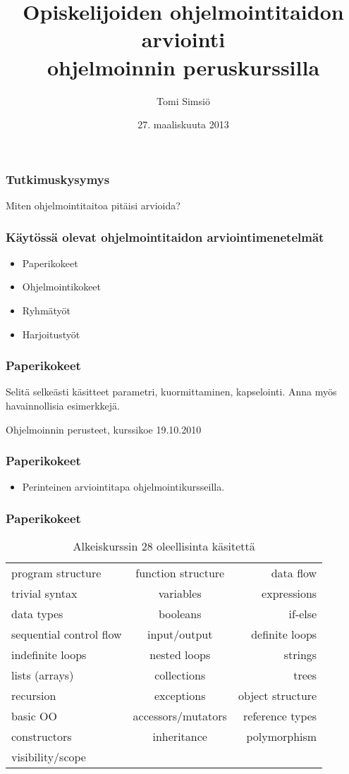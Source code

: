 \documentclass[finnish]{beamer}
\author{Tomi Simsiö}
\title{Opiskelijoiden ohjelmointitaidon arviointi \texorpdfstring{\\}{}ohjelmoinnin peruskurssilla}
\institute{HELSINGIN YLIOPISTO\\Tietojenkäsittelytieteen laitos}
\date{27. maaliskuuta 2013}
\begin{document}
\frame{\titlepage}

\frame
{
  \frametitle{Tutkimuskysymys}
  {\LARGE Miten ohjelmointitaitoa pitäisi arvioida?}
}

\frame
{
  \frametitle{Käytössä olevat ohjelmointitaidon arviointimenetelmät}
  \begin{itemize}
    \item Paperikokeet
    \item Ohjelmointikokeet
    \item Ryhmätyöt
    \item Harjoitustyöt
  \end{itemize}
}

\frame
{
  \frametitle{Paperikokeet}
  Selitä selkeästi käsitteet parametri, kuormittaminen, kapselointi. Anna myös havainnollisia esimerkkejä.
  \vspace{5mm}

  \textcolor[rgb]{0.5,0.5,0.5}{\scriptsize Ohjelmoinnin perusteet, kurssikoe 19.10.2010}
}

\frame
{
  \frametitle{Paperikokeet}
  \begin{itemize}
    \item Perinteinen arviointitapa ohjelmointikursseilla.
  \end{itemize}
}

\frame
{
  \frametitle{Paperikokeet}
  \begin{table}
    \begin{tabular}{ l c r }
      program structure & function structure & data flow \\
      trivial syntax & variables & expressions \\
      data types & booleans & if-else \\
      sequential control flow & input/output & definite loops \\
      indefinite loops & nested loops & strings \\
      lists (arrays) & collections & trees \\
      recursion & exceptions & object structure \\
      basic OO & accessors/mutators & reference types \\
      constructors & inheritance & polymorphism \\
      visibility/scope \\
    \end{tabular}
  \caption{Alkeiskurssin 28 oleellisinta käsitettä}
  \label{tab:kasitteet}
  \end{table}
}
\end{document}
